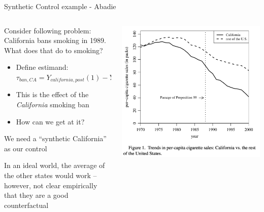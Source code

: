 \documentclass[notes,11pt, aspectratio=169]{beamer}
\newenvironment{wideitemize}{\itemize\addtolength{\itemsep}{10pt}}{\enditemize}
\begin{document}
\begin{frame}{Synthetic Control example - Abadie }
  \begin{columns}[T] %
    \begin{column}{0.5\textwidth}
      \begin{wideitemize}
      \item Consider following problem: California bans smoking in 1989. What does that do to smoking?
        \begin{itemize}
        \item Define estimand: $\tau_{ban,CA} = Y_{california, post}(1) - Y_{california, post}(0)$
        \item This is the effect of the \emph{California} smoking ban 
        \item How can we get at it? 
        \end{itemize}
      \item We need a ``synthetic California'' as our control
      \item In an ideal world, the average of the other states would
        work -- however, not clear empirically that they are a good
        counterfactual
      \end{wideitemize}
    \end{column}%
    \hfill%
    \begin{column}{.5\textwidth}
      \includegraphics[width=\linewidth]{images/abadie2010a.png}
    \end{column}%
  \end{columns}
\end{frame}
\end{document}
